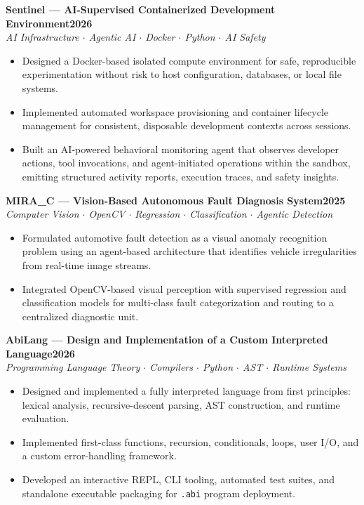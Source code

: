 \documentclass[11pt,letterpaper]{article}
\newcommand{\entry}[3]{%
  \noindent\textbf{#1}\hfill\textbf{#2}\\[1pt]
  \textit{\small #3}\par\vspace{1pt}
}
\begin{document}
\entry{Sentinel --- AI-Supervised Containerized Development Environment}{2026}
{AI Infrastructure $\cdot$ Agentic AI $\cdot$ Docker $\cdot$ Python $\cdot$ AI Safety}
\begin{itemize}
  \item Designed a Docker-based isolated compute environment for safe, reproducible
        experimentation without risk to host configuration, databases, or local
        file systems.
  \item Implemented automated workspace provisioning and container lifecycle
        management for consistent, disposable development contexts across sessions.
  \item Built an AI-powered behavioral monitoring agent that observes developer
        actions, tool invocations, and agent-initiated operations within the
        sandbox, emitting structured activity reports, execution traces, and safety
        insights.
\end{itemize}
\vspace{3pt}

\entry{MIRA\_C --- Vision-Based Autonomous Fault Diagnosis System}{2025}
{Computer Vision $\cdot$ OpenCV $\cdot$ Regression $\cdot$ Classification $\cdot$ Agentic Detection}
\begin{itemize}
  \item Formulated automotive fault detection as a visual anomaly recognition
        problem using an agent-based architecture that identifies vehicle
        irregularities from real-time image streams.
  \item Integrated OpenCV-based visual perception with supervised regression and
        classification models for multi-class fault categorization and routing to a
        centralized diagnostic unit.
\end{itemize}
\vspace{3pt}

\entry{AbiLang --- Design and Implementation of a Custom Interpreted Language}{2026}
{Programming Language Theory $\cdot$ Compilers $\cdot$ Python $\cdot$ AST $\cdot$ Runtime Systems}
\begin{itemize}
  \item Designed and implemented a fully interpreted language from first
        principles: lexical analysis, recursive-descent parsing, AST construction,
        and runtime evaluation.
  \item Implemented first-class functions, recursion, conditionals, loops, user
        I/O, and a custom error-handling framework.
  \item Developed an interactive REPL, CLI tooling, automated test suites, and
        standalone executable packaging for \texttt{.abi} program deployment.
\end{itemize}
\end{document}
